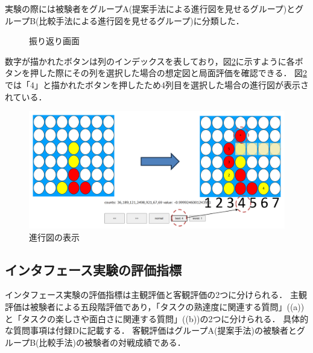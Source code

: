 実験の際には被験者をグループA(提案手法による進行図を見せるグループ)とグループB(比較手法による進行図を見せるグループ)に分類した．
\begin{figure}[t]
	\centering
    \setlength{\fboxsep}{1pt} %
    \setlength{\fboxrule}{1pt} %
	\caption{振り返り画面}
	\label{fig:lookBack}
\end{figure}
数字が描かれたボタンは列のインデックスを表しており，図\ref{fig:trajSystem}に示すように各ボタンを押した際にその列を選択した場合の想定図と局面評価を確認できる．
図\ref{fig:trajSystem}では「4」と描かれたボタンを押したため4列目を選択した場合の進行図が表示されている．
\begin{figure}[t]
    \centering
    \includegraphics[width=\linewidth]{./figure/4-traj.png}
	\caption{進行図の表示}
	\label{fig:trajSystem}
\end{figure}
\subsection{インタフェース実験の評価指標}
インタフェース実験の評価指標は主観評価と客観評価の2つに分けられる．
主観評価は被験者による五段階評価であり，「タスクの熟達度に関連する質問」((a))と「タスクの楽しさや面白さに関連する質問」((b))の2つに分けられる．
具体的な質問事項は付録Dに記載する．
客観評価はグループA(提案手法)の被験者とグループB(比較手法)の被験者の対戦成績である．

